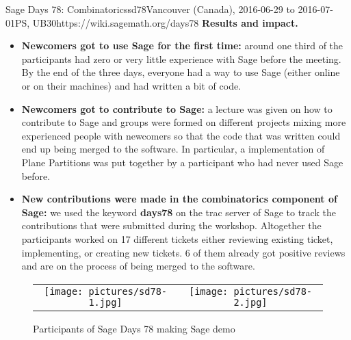 \begin{event}{Sage Days 78: Combinatorics}{sd78}{Vancouver (Canada), 2016-06-29 to 2016-07-01}{PS, UB}{30}{https://wiki.sagemath.org/days78}
\textbf{Results and impact.} 
\begin{itemize}
\item \textbf{Newcomers got to use Sage for the first time:} around one
third of the participants had zero or very little experience with Sage before the meeting. By the
end of the three days, everyone had a way to use Sage (either online or on their machines)
and had written a bit of code.
\item \textbf{Newcomers got to contribute to Sage:} a lecture was given on how to contribute to Sage
and groups were formed on different projects mixing more experienced people with newcomers so
that the code that was written could end up being merged to the software. In particular, a implementation
of Plane Partitions was put together by a participant who had never used Sage before.
\item \textbf{New contributions were made in the combinatorics component of Sage:} we used the keyword
\textbf{days78} on the trac server of Sage to track the contributions that were submitted during the workshop.
 Altogether the participants
worked on 17 different tickets either reviewing
existing ticket, implementing, or creating new tickets. 6 of them already got positive reviews and are
on the process of being merged to the software.
\end{itemize}

\begin{figure}[ht]
\caption*{Participants of Sage Days 78 making Sage demo}
\begin{tabular}{cc}
\texttt{[image: pictures/sd78-1.jpg]}
&
\texttt{[image: pictures/sd78-2.jpg]}
\end{tabular}
\end{figure}



\end{event}
